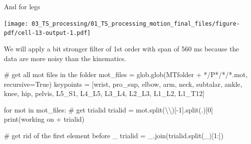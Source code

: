 \documentclass[
  letterpaper,
  DIV=11,
  numbers=noendperiod]{scrreprt}
\newenvironment{Shaded}{\begin{snugshade}}{\end{snugshade}}
\newcommand{\BuiltInTok}[1]{\textcolor[rgb]{0.00,0.23,0.31}{#1}}
\newcommand{\CharTok}[1]{\textcolor[rgb]{0.13,0.47,0.30}{#1}}
\newcommand{\CommentTok}[1]{\textcolor[rgb]{0.37,0.37,0.37}{#1}}
\newcommand{\ControlFlowTok}[1]{\textcolor[rgb]{0.00,0.23,0.31}{#1}}
\newcommand{\DecValTok}[1]{\textcolor[rgb]{0.68,0.00,0.00}{#1}}
\newcommand{\KeywordTok}[1]{\textcolor[rgb]{0.00,0.23,0.31}{#1}}
\newcommand{\NormalTok}[1]{\textcolor[rgb]{0.00,0.23,0.31}{#1}}
\newcommand{\OperatorTok}[1]{\textcolor[rgb]{0.37,0.37,0.37}{#1}}
\newcommand{\StringTok}[1]{\textcolor[rgb]{0.13,0.47,0.30}{#1}}
\newcommand{\VariableTok}[1]{\textcolor[rgb]{0.07,0.07,0.07}{#1}}
\begin{document}
And for legs

\texttt{[image: 03\_TS\_processing/01\_TS\_processing\_motion\_final\_files/figure-pdf/cell-13-output-1.pdf]}

We will apply a bit stronger filter of 1st order with span of 560 ms
because the data are more noisy than the kinematics.

\begin{Shaded}
\begin{Highlighting}[]
\CommentTok{\# get all mot files in the folder}
\NormalTok{mot\_files }\OperatorTok{=}\NormalTok{ glob.glob(MTfolder }\OperatorTok{+} \StringTok{\textquotesingle{}*/P*/*/*.mot\textquotesingle{}}\NormalTok{, recursive}\OperatorTok{=}\VariableTok{True}\NormalTok{)}
\NormalTok{keypoints }\OperatorTok{=}\NormalTok{ [}\StringTok{\textquotesingle{}wrist\textquotesingle{}}\NormalTok{, }\StringTok{\textquotesingle{}pro\_sup\textquotesingle{}}\NormalTok{, }\StringTok{\textquotesingle{}elbow\textquotesingle{}}\NormalTok{, }\StringTok{\textquotesingle{}arm\textquotesingle{}}\NormalTok{, }\StringTok{\textquotesingle{}neck\textquotesingle{}}\NormalTok{, }\StringTok{\textquotesingle{}subtalar\textquotesingle{}}\NormalTok{, }\StringTok{\textquotesingle{}ankle\textquotesingle{}}\NormalTok{, }\StringTok{\textquotesingle{}knee\textquotesingle{}}\NormalTok{, }\StringTok{\textquotesingle{}hip\textquotesingle{}}\NormalTok{, }\StringTok{\textquotesingle{}pelvis\textquotesingle{}}\NormalTok{, }\StringTok{\textquotesingle{}L5\_S1\textquotesingle{}}\NormalTok{, }\StringTok{\textquotesingle{}L4\_L5\textquotesingle{}}\NormalTok{, }\StringTok{\textquotesingle{}L3\_L4\textquotesingle{}}\NormalTok{, }\StringTok{\textquotesingle{}L2\_L3\textquotesingle{}}\NormalTok{, }\StringTok{\textquotesingle{}L1\_L2\textquotesingle{}}\NormalTok{, }\StringTok{\textquotesingle{}L1\_T12\textquotesingle{}}\NormalTok{]}

\ControlFlowTok{for}\NormalTok{ mot }\KeywordTok{in}\NormalTok{ mot\_files:}
    \CommentTok{\# get trialid}
\NormalTok{    trialid }\OperatorTok{=}\NormalTok{ mot.split(}\StringTok{\textquotesingle{}}\CharTok{\textbackslash{}\textbackslash{}}\StringTok{\textquotesingle{}}\NormalTok{)[}\OperatorTok{{-}}\DecValTok{1}\NormalTok{].split(}\StringTok{\textquotesingle{}.\textquotesingle{}}\NormalTok{)[}\DecValTok{0}\NormalTok{]}
    \BuiltInTok{print}\NormalTok{(}\StringTok{\textquotesingle{}working on \textquotesingle{}} \OperatorTok{+}\NormalTok{ trialid)}

    \CommentTok{\# get rid of the first element before \_}
\NormalTok{    trialid }\OperatorTok{=} \StringTok{\textquotesingle{}\_\textquotesingle{}}\NormalTok{.join(trialid.split(}\StringTok{\textquotesingle{}\_\textquotesingle{}}\NormalTok{)[}\DecValTok{1}\NormalTok{:])}


\end{Highlighting}
\end{Shaded}
\end{document}
